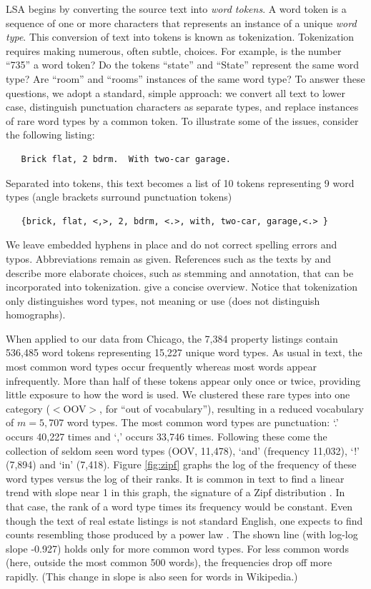\documentclass[12pt]{article}
\begin{document}
 LSA begins by converting the source text into {\em word tokens}.  A word token
 is a sequence of one or more characters that represents an instance of a unique
 {\em word type}.  This conversion of text into tokens is known as tokenization.
  Tokenization requires making numerous, often subtle, choices.  For example, is
 the number ``735'' a word token?  Do the tokens ``state'' and ``State''
 represent the same word type?  Are ``room'' and ``rooms'' instances of the same word
 type?  To answer these questions, we adopt a standard, simple approach: we
 convert all text to lower case, distinguish punctuation characters as separate
 types, and replace instances of rare word types by a common token.  To
 illustrate some of the issues, consider the following listing:
 \begin{verbatim}
   Brick flat, 2 bdrm.  With two-car garage. \end{verbatim} 
 \noindent
 Separated into tokens, this text becomes a list of 10 tokens representing 9
 word types (angle brackets surround punctuation tokens)
 \begin{verbatim}
   {brick, flat, <,>, 2, bdrm, <.>, with, two-car, garage,<.> } \end{verbatim} 
 \noindent
 We leave embedded hyphens in place and do not correct spelling errors and
 typos.  Abbreviations remain as given.  References such as the texts by
 \citet{manning99} and \citet{jurafsky09} describe more elaborate choices, such
 as stemming and annotation, that can be incorporated into
 tokenization. \citet{turney10} give a concise overview.  Notice that
 tokenization only distinguishes word types, not  meaning or use
 (does not distinguish homographs).

  
 When applied to our data from Chicago, the 7,384 property listings contain
 536,485 word tokens representing 15,227 unique word types.  As usual in text,
 the most common word types occur frequently whereas most words appear
 infrequently.  More than half of these tokens appear only once or twice,
 providing little exposure to how the word is used.  We clustered these rare
 types into one category ($<$OOV$>$, for ``out of vocabulary''), resulting in a
 reduced vocabulary of $m = 5,707$ word types.  The most common word types are
 punctuation: `.'  occurs 40,227 times and `,' occurs 33,746 times.  Following
 these come the collection of seldom seen word types (OOV, 11,478), `and'
 (frequency 11,032), `!' (7,894) and `in' (7,418).  Figure \ref{fig:zipf} graphs
 the log of the frequency of these word types versus the log of their ranks.  It
 is common in text to find a linear trend with slope near 1 in this graph, the
 signature of a Zipf distribution \citep{zipf35, baayen02}.  In that case, the
 rank of a word type times its frequency would be constant.  Even though the
 text of real estate listings is not standard English, one expects to find
 counts resembling those produced by a power law \citep{clauset09}.  The shown
 line (with log-log slope -0.927) holds only for more common word types.  For
 less common words (here, outside the most common 500 words), the frequencies
 drop off more rapidly.  (This change in slope is also seen for words in
 Wikipedia.)
\end{document}
